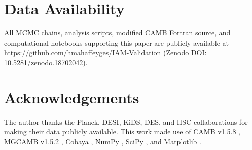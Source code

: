\documentclass[12pt,a4paper]{article}
\begin{document}
\section*{Data Availability}

All MCMC chains, analysis scripts, modified CAMB Fortran source, and
computational notebooks supporting this paper are publicly available at
\url{https://github.com/hmahaffeyges/IAM-Validation} (Zenodo DOI:
\href{https://doi.org/10.5281/zenodo.18702042}{10.5281/zenodo.18702042}).

\section*{Acknowledgements}

The author thanks the Planck, DESI, KiDS, DES, and HSC collaborations for
making their data publicly available. This work made use of CAMB v1.5.8
\citep{lewis2002}, MGCAMB v1.5.2 \citep{wang2023}, Cobaya \citep{torrado2021},
NumPy \citep{harris2020}, SciPy \citep{virtanen2020}, and Matplotlib
\citep{hunter2007}.
\end{document}
